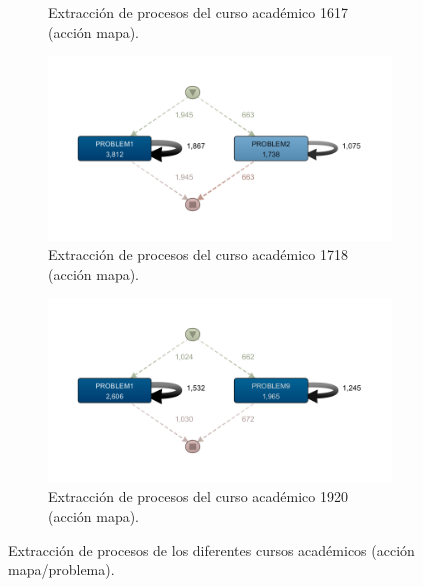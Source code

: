\begin{figure}[H]
\begin{subfigure}[t]{0.60\textwidth}
    \caption{Extracción de procesos del curso académico 1617 (acción mapa).}
    \label{fig:mapAño1617}
  \end{subfigure}
  \hfill
  \begin{subfigure}[t]{0.60\textwidth}
    \includegraphics[width=1.10\textwidth, height=0.80\textwidth]{imagenes/DISCO_map/Dataset FusionadoYear1718.png}
    \caption{Extracción de procesos del curso académico 1718 (acción mapa).}
    \label{fig:mapAño1718}
  \end{subfigure}
  \hfill
  \begin{subfigure}[t]{0.60\textwidth}
    \includegraphics[width=1.10\textwidth, height=0.80\textwidth]{imagenes/DISCO_map/Dataset FusionadoYear1920.png}
    \caption{Extracción de procesos del curso académico 1920 (acción mapa).}
    \label{fig:mapAño1920}
  \end{subfigure}
  \caption{Extracción de procesos de los diferentes cursos académicos (acción mapa/problema).}
\end{figure}

